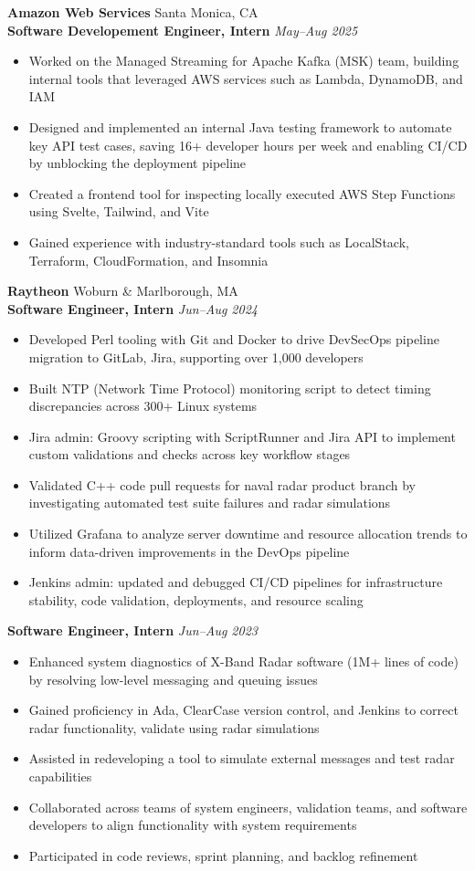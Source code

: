 \documentclass[letterpaper,10pt]{article}
\newcommand{\company}[2]{
    \vspace{7pt}
    {\large \textbf{#1}}
    \hfill
    {\normalsize {#2}}
    \\
}
\newcommand{\position}[2]{
    \vspace{5pt}
    {\normalsize \textbf {#1}}
    \hfill
    {\normalsize \textit{#2}}
    \\
}
\newcommand{\itemsBegin}{
    \begin{itemize}[leftmargin=0.2in, labelsep=0.05in, itemsep=0pt, parsep=1pt, topsep=0pt, partopsep=0pt]
    \small
}
\newcommand{\itemsEnd}{\end{itemize}}
\begin{document}
    \company{Amazon Web Services}{Santa Monica, CA}
    \position{Software Developement Engineer, Intern}{May--Aug 2025}
    \itemsBegin{}
        \item Worked on the Managed Streaming for Apache Kafka (MSK) team, building internal tools that leveraged AWS services such as Lambda, DynamoDB, and IAM
        \item Designed and implemented an internal Java testing framework to automate key API test cases, saving 16+ developer hours per week and enabling CI/CD by unblocking the deployment pipeline
        \item Created a frontend tool for inspecting locally executed AWS Step Functions using Svelte, Tailwind, and Vite
        \item Gained experience with industry-standard tools such as LocalStack, Terraform, CloudFormation, and Insomnia
    \itemsEnd{}

    \company{Raytheon}{Woburn \& Marlborough, MA}

    \position{Software Engineer, Intern}{Jun--Aug 2024}
    \itemsBegin{}
        \item Developed Perl tooling with Git and Docker to drive DevSecOps pipeline migration to GitLab, Jira, supporting over 1,000 developers
        \item Built NTP (Network Time Protocol) monitoring script to detect timing discrepancies across 300+ Linux systems
        \item Jira admin: Groovy scripting with ScriptRunner and Jira API to implement custom validations and checks across key workflow stages
        \item Validated C++ code pull requests for naval radar product branch by investigating automated test suite failures and radar simulations
        \item Utilized Grafana to analyze server downtime and resource allocation trends to inform data-driven improvements in the DevOps pipeline
        \item Jenkins admin: updated and debugged CI/CD pipelines for infrastructure stability, code validation, deployments, and resource scaling
    \itemsEnd{}

    \position{Software Engineer, Intern}{Jun--Aug 2023}
    \itemsBegin{}
        \item Enhanced system diagnostics of X-Band Radar software (1M+ lines of code) by resolving low-level messaging and queuing issues
        \item Gained proficiency in Ada, ClearCase version control, and Jenkins to correct radar functionality, validate using radar simulations
        \item Assisted in redeveloping a tool to simulate external messages and test radar capabilities
        \item Collaborated across teams of system engineers, validation teams, and software developers to align functionality with system requirements
        \item Participated in code reviews, sprint planning, and backlog refinement
    \itemsEnd{}
\end{document}
